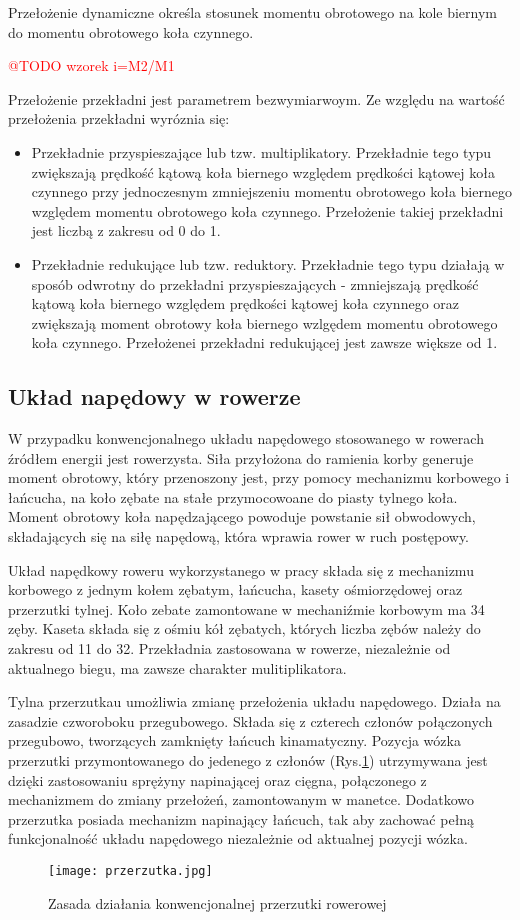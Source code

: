 Przełożenie dynamiczne określa stosunek momentu obrotowego na kole biernym do momentu obrotowego koła czynnego.  

\textcolor{red}{@TODO wzorek i=M2/M1}

Przełożenie przekładni jest parametrem bezwymiarwoym. Ze względu na wartość przełożenia przekładni wyróznia się:
\begin{itemize}
\item
Przekładnie przyspieszające lub tzw. multiplikatory. Przekładnie tego typu zwiększają prędkość kątową koła biernego względem prędkości kątowej koła czynnego przy jednoczesnym zmniejszeniu momentu obrotowego koła biernego względem momentu obrotowego koła czynnego. Przełożenie takiej przekładni jest liczbą z zakresu od 0 do 1.
\item
Przekładnie redukujące lub tzw. reduktory. Przekładnie tego typu działają w sposób odwrotny do przekładni przyspieszających - zmniejszają prędkość kątową koła biernego względem prędkości kątowej koła czynnego oraz zwiększają moment obrotowy koła biernego wzlgędem momentu obrotowego koła czynnego. Przełożenei przekładni redukującej jest zawsze większe od 1.
\end{itemize} 
\subsection{Układ napędowy w rowerze}
W przypadku konwencjonalnego układu napędowego stosowanego w rowerach źródłem energii jest rowerzysta. Siła przyłożona do ramienia korby generuje moment obrotowy, który przenoszony jest, przy pomocy mechanizmu korbowego i łańcucha, na koło zębate na stałe przymocowoane do piasty tylnego koła. Moment obrotowy koła napędzającego powoduje powstanie sił obwodowych, składających się na siłę napędową, która wprawia rower w ruch postępowy.

Układ napędkowy roweru wykorzystanego w pracy składa się z mechanizmu korbowego z jednym kołem zębatym, łańcucha, kasety ośmiorzędowej oraz przerzutki tylnej. Koło zebate zamontowane w mechaniźmie korbowym ma 34 zęby. Kaseta składa się z ośmiu kół zębatych, których liczba zębów należy do zakresu od 11 do 32. Przekładnia zastosowana w rowerze, niezależnie od aktualnego biegu, ma zawsze charakter mulitiplikatora.

Tylna przerzutkau umożliwia zmianę przełożenia układu napędowego. Działa na zasadzie czworoboku przegubowego. Składa się z czterech członów połączonych przegubowo, tworzących zamknięty łańcuch kinamatyczny. Pozycja wózka przerzutki przymontowanego do jedenego z członów (Rys.\ref{fig:przerzutka}) utrzymywana jest dzięki zastosowaniu sprężyny napinającej oraz cięgna, połączonego z mechanizmem do zmiany przełożeń, zamontowanym w manetce. Dodatkowo przerzutka posiada mechanizm napinający łańcuch, tak aby zachować pełną funkcjonalność układu napędowego niezależnie od aktualnej pozycji wózka. 
\begin{figure}[h]
    \centering
    \texttt{[image: przerzutka.jpg]}
    \caption{Zasada działania konwencjonalnej przerzutki rowerowej}
    \label{fig:przerzutka}
\end{figure}

